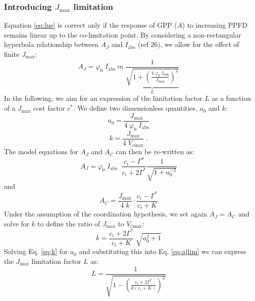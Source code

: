\documentclass{myreport}
\begin{document}
\subsubsection{Introducing $J_{\mathrm{max}}$ limitation}
Equation \ref{eq:lue} is correct only if the response of GPP ($A$) to increasing PPFD remains linear up to the co-limitation point. 
By considering a non-rectangular hyperbola relationship between $A_J$ and $I_{\mathrm{abs}}$ (ref 26), we allow for the effect of finite $J_{\mathrm{max}}$:
\begin{equation}
\label{eq:ajlim}
    A_J = \varphi_0 \; I_{\mathrm{abs}} \; m \; \underbrace{ \frac{1}{\sqrt{1+ \left( \frac{4\;\varphi_0\;I_{\mathrm{abs}}}{J_{\mathrm{max}}} \right)^{2}}} }_{L}
\end{equation}
In the following, we aim for an expression of the limitation factor $L$ as a function of a $J_{\mathrm{max}}$ cost factor $c^{\ast}$. 
We define two dimensionless quantities, $a_0$ and $k$:
\begin{equation}
\label{eq:a0}
    a_0 = \frac{J_{\mathrm{max}}}{4\;\varphi_0\;I_{\mathrm{abs}}}
\end{equation}
\begin{equation}
    k = \frac{J_{\mathrm{max}}}{4\;V_{\mathrm{cmax}}}\;.
\end{equation}
The model equations for $A_J$ and $A_C$ can then be re-written as:
\begin{equation}
\label{eq:ajlim2}
    A_J = \varphi_0 \; I_{\mathrm{abs}} \; \; \frac{c_i - \Gamma^{\ast}}{c_i + 2\Gamma^{\ast}} \frac{1}{\sqrt{1+a_0^{-2}}}
\end{equation}
and
\begin{equation}
    A_C = \frac{J_{\mathrm{max}}}{4\;k} \cdot \frac{c_i - \Gamma^{\ast}}{c_i + K}
\end{equation}
Under the assumption of the coordination hypothesis, we set again $A_J = A_C$ and solve for $k$ to define the ratio of $J_{\mathrm{max}}$ to $V_{\mathrm{cmax}}$:
\begin{equation}
\label{eq:k}
    k = \frac{c_i + 2\Gamma^{\ast}}{c_i + K} \; \sqrt{a_0^2 + 1}
\end{equation}
Solving Eq. \ref{eq:k} for $a_0$ and substituting this into Eq. \ref{eq:ajlim} we can express the $J_{\mathrm{max}}$ limitation factor $L$ as:
\begin{equation}
\label{eq:ajlim3}
    L = \frac{1}{\sqrt{1 - \left( \frac{c_i+2\Gamma^{\ast}}{k(c_i+K)} \right)^{2}}}
\end{equation}
\end{document}
